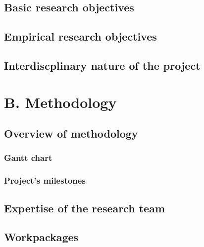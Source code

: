 \subsection{Basic research objectives}

\subsection{Empirical research objectives}


\subsection{Interdiscplinary nature of the project}


\section{B. Methodology}

\subsection{Overview of \project methodology}

\subsubsection{Gantt chart}

\subsubsection{Project's milestones}

\subsection{Expertise of the research team}


\subsection{Workpackages}

